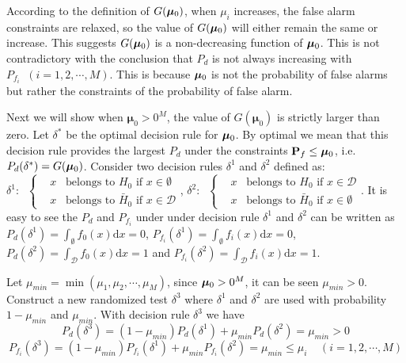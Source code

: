 According to the definition of $G(\boldsymbol{\mu}_0)$, when $\mu_i$ increases, the false alarm constraints are relaxed, 
so the value of $G(\boldsymbol{\mu}_0)$ will either remain the same or increase. 
This suggests $G(\boldsymbol{\mu}_0)$ is a non-decreasing function of $\boldsymbol{\mu}_0$. 
This is not contradictory with the conclusion that 
$P_d$ is not always increasing with $P_{f_i}\;\;(i=1, 2, \cdots, M)$.  This is because $\boldsymbol{\mu}_0$ is not the probability of false alarms but rather the constraints of the probability of false alarm. 

Next we will show when $\boldsymbol{\mu}_0 > 0^M$, the value of $G(\boldsymbol{\mu}_0)$ is strictly larger than zero.
Let $\delta^\ast$ be the optimal decision rule for $\boldsymbol{\mu}_0$. By optimal  we mean that this decision rule provides the largest $P_d$ under the constraints $\mathbf{P}_f \leq \boldsymbol{\mu}_0$, i.e. $P_d(\delta^\ast) = G(\boldsymbol{\mu}_0)$. Consider two decision rules $\delta^1$ and $\delta^2$ defined as:
\\
$  \delta^1:\;\; \begin{cases}
    &x \;\;\;\text{belongs to $H_0$ if } x \in \emptyset \\
    &x \;\;\;\text{belongs to $\bar{H}_0$ if } x \in \mathcal{D}
  \end{cases}
    $, 
$
  \delta^2:\;\; \begin{cases}
    &x \;\;\;\text{belongs to $H_0$ if } x \in \mathcal{D} \\
    &x \;\;\;\text{belongs to $\bar{H}_0$ if } x \in \emptyset
  \end{cases}
$. 
It is easy to see the $P_d$ and $P_{f_i}$ under under decision rule $\delta^1$ and $\delta^2$ can be written as
$  P_d(\delta^1) = \int_{\emptyset}f_0(x)\mathrm{d}x = 0$, 
   $ P_{f_i}(\delta^1) = \int_{\emptyset}f_i(x)\mathrm{d}x = 0$, 
$    P_d(\delta^2) = \int_{\mathcal{D}}f_0(x)\mathrm{d}x = 1$ and 
   $ P_{f_i}(\delta^2) = \int_{\mathcal{D}}f_i(x)\mathrm{d}x = 1$.

Let $\mu_{min} = \min(\mu_1, \mu_2, \cdots, \mu_M)$, since $\boldsymbol{\mu}_0 > 0^M$, it can be seen $\mu_{min} > 0$. Construct a new randomized test $\delta^3$ where $\delta^1$ and $\delta^2$ are used with probability $1 - \mu_{min} $ and $\mu_{min}$. With decision rule $\delta^3$ we have
\begin{equation}
  P_d(\delta^3) = (1 - \mu_{min})P_d(\delta^1) + \mu_{min}P_d(\delta^2) = \mu_{min} > 0
\end{equation}
\begin{equation}
  P_{f_i}(\delta^3) = (1 - \mu_{min})P_{f_i}(\delta^1) + \mu_{min}P_{f_i}(\delta^2) = \mu_{min} \leq \mu_i \;\;\;\;(i = 1, 2, \cdots, M)
\end{equation}


